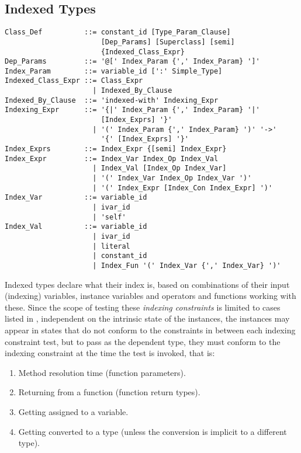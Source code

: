 \subsection{Indexed Types}
\label{sec:indexed-types}

\syntax\begin{lstlisting}
Class_Def          ::= constant_id [Type_Param_Clause] 
                       [Dep_Params] [Superclass] [semi] 
                       {Indexed_Class_Expr}
Dep_Params         ::= '@[' Index_Param {',' Index_Param} ']'
Index_Param        ::= variable_id [':' Simple_Type]
Indexed_Class_Expr ::= Class_Expr
                     | Indexed_By_Clause
Indexed_By_Clause  ::= 'indexed-with' Indexing_Expr
Indexing_Expr      ::= '{|' Index_Param {',' Index_Param} '|'
                       [Index_Exprs] '}'
                     | '(' Index_Param {',' Index_Param} ')' '->'
                       '{' [Index_Exprs] '}'
Index_Exprs        ::= Index_Expr {[semi] Index_Expr}
Index_Expr         ::= Index_Var Index_Op Index_Val
                     | Index_Val [Index_Op Index_Var]
                     | '(' Index_Var Index_Op Index_Var ')'
                     | '(' Index_Expr [Index_Con Index_Expr] ')'
Index_Var          ::= variable_id 
                     | ivar_id
                     | 'self'
Index_Val          ::= variable_id 
                     | ivar_id 
                     | literal
                     | constant_id
                     | Index_Fun '(' Index_Var {',' Index_Var} ')'
\end{lstlisting}

Indexed types declare what their index is, based on combinations of their input (indexing) variables, instance variables and operators and functions working with these. Since the scope of testing these {\em indexing constraints} is limited to cases listed in , independent on the intrinsic state of the instances, the instances may appear in states that do not conform to the constraints in between each indexing constraint test, but to pass as the dependent type, they must conform to the indexing constraint at the time the test is invoked, that is: 
\begin{enumerate}
\item Method resolution time (function parameters). 
\item Returning from a function (function return types). 
\item Getting assigned to a variable. 
\item Getting converted to a type (unless the conversion is implicit to a different type). 
\end{enumerate}

